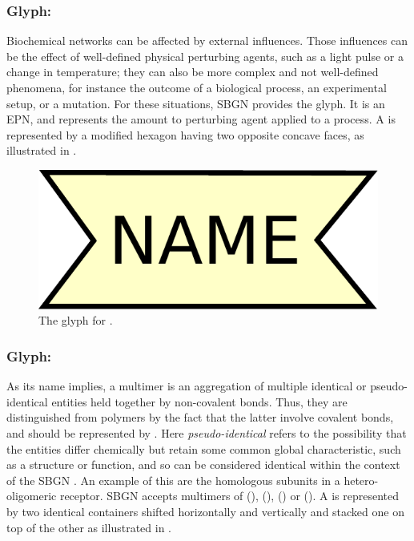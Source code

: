 \subsubsection{Glyph: }
\label{sec:perturbing agent}
 
Biochemical networks can be affected by external influences.  Those
influences can be the effect of well-defined physical perturbing agents, such as a light
pulse or a change in temperature; they can also be more complex and not
well-defined phenomena, for instance the outcome of a biological process, an experimental
setup, or a mutation.  For these situations, SBGN provides the
 glyph. It is an EPN, and represents the amount to perturbing agent applied to a process. A  is represented by a modified hexagon
having two opposite concave faces, as illustrated in .

\begin{figure}[H]
  \centering
  \includegraphics[scale = 0.3]{le_images/perturbing_agent}
  \caption{The \PD glyph for .}
  \label{fig:perturbing agent}
\end{figure}

\subsubsection{Glyph: }
\label{sec:multimer}

As its name implies, a multimer is an aggregation of multiple identical or pseudo-identical entities held together by non-covalent bonds. Thus, they are distinguished from polymers by the fact that the latter involve covalent bonds, and should be represented by . Here \emph{pseudo-identical} refers to the possibility that the entities differ chemically but retain some common global characteristic, such as a structure or function, and so can be considered identical within the context of the SBGN \PD.  An example of this are the homologous subunits in a hetero-oligomeric receptor. SBGN \PD accepts multimers of  (),  (),  () or  (). A  is represented by two identical containers shifted horizontally and vertically and stacked one on top of the other as illustrated in .


